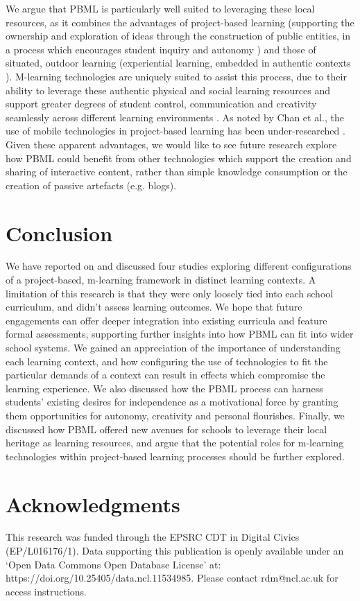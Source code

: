 \documentclass[,hyphens]{sigchi}
\begin{document}
We argue that PBML is particularly well suited to leveraging these local resources, as it combines the advantages of project-based learning (supporting the ownership and exploration of ideas through the construction of public entities, in a process which encourages student inquiry and autonomy \cite{Noss2017, Larmer2015}) and those of situated, outdoor learning (experiential learning, embedded in authentic contexts \cite{Lave1991}). M-learning technologies are uniquely suited to assist this process, due to their ability to leverage these authentic physical and social learning resources and support greater degrees of student control, communication and creativity seamlessly across different learning environments \cite{Sharples2007, Richardson2018}. As noted by Chan et al., the use of mobile technologies in project-based learning has been under-researched \cite{Chan2015}. Given these apparent advantages, we would like to see future research explore how PBML could benefit from other technologies which support the creation and sharing of interactive content, rather than simple knowledge consumption or the creation of passive artefacts (e.g. blogs).

\section{Conclusion}
We have reported on and discussed four studies exploring different configurations of a project-based, m-learning framework in distinct learning contexts. A limitation of this research is that they were only loosely tied into each school curriculum, and didn't assess learning outcomes. We hope that future engagements can offer deeper integration into existing curricula and feature formal assessments, supporting further insights into how PBML can fit into wider school systems. We gained an appreciation of the importance of understanding each learning context, and how configuring the use of technologies to fit the particular demands of a context can result in effects which compromise the learning experience. We also discussed how the PBML process can harness students' existing desires for independence as a motivational force by granting them opportunities for autonomy, creativity and personal flourishes. Finally, we discussed how PBML offered new avenues for schools to leverage their local heritage as learning resources, and argue that the potential roles for m-learning technologies within project-based learning processes should be further explored.

\section{Acknowledgments}
This research was funded through the EPSRC CDT in Digital Civics (EP/L016176/1). Data supporting this publication is openly available under an `Open Data Commons Open Database License' at: https://doi.org/10.25405/data.ncl.11534985. Please contact rdm@ncl.ac.uk for access instructions.

\balance{}



\end{document}
